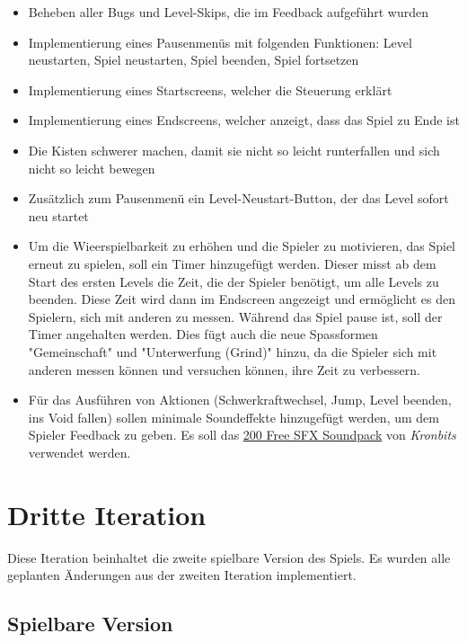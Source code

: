 \documentclass{article}
\begin{document}
\begin{itemize}
    \item Beheben aller Bugs und Level-Skips, die im Feedback aufgeführt wurden
    \item Implementierung eines Pausenmenüs mit folgenden Funktionen: Level neustarten, Spiel neustarten, Spiel beenden, Spiel fortsetzen
    \item Implementierung eines Startscreens, welcher die Steuerung erklärt
    \item Implementierung eines Endscreens, welcher anzeigt, dass das Spiel zu Ende ist
    \item Die Kisten schwerer machen, damit sie nicht so leicht runterfallen und sich nicht so leicht bewegen
    \item Zusätzlich zum Pausenmenü ein Level-Neustart-Button, der das Level sofort neu startet
    \item Um die Wieerspielbarkeit zu erhöhen und die Spieler zu motivieren, das Spiel erneut zu spielen, soll ein Timer hinzugefügt werden. Dieser misst ab dem Start des ersten Levels
    die Zeit, die der Spieler benötigt, um alle Levels zu beenden. Diese Zeit wird dann im Endscreen angezeigt und ermöglicht es den Spielern, sich mit anderen zu messen. Während das Spiel
    pause ist, soll der Timer angehalten werden. Dies fügt auch die neue Spassformen "Gemeinschaft" und "Unterwerfung (Grind)" hinzu, da die Spieler sich mit anderen messen können und
    versuchen können, ihre Zeit zu verbessern.
    \item Für das Ausführen von Aktionen (Schwerkraftwechsel, Jump, Level beenden, ins Void fallen) sollen minimale Soundeffekte hinzugefügt werden, um dem Spieler Feedback zu geben.
    Es soll das \href{https://kronbits.itch.io/freesfx}{200 Free SFX Soundpack} von \textit{Kronbits} verwendet werden.
\end{itemize}

\newpage

\section{Dritte Iteration}

Diese Iteration beinhaltet die zweite spielbare Version des Spiels. Es wurden alle geplanten Änderungen aus der zweiten Iteration implementiert.

\subsection{Spielbare Version}
\end{document}
